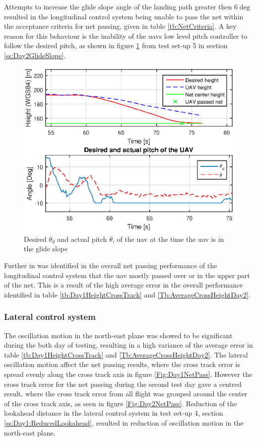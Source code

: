 Attempts to increase the glide slope angle of the landing path greater then $6 \deg$ resulted in the longitudinal control system being unable to pass the net within the acceptance criteria for net passing, given in table \ref{tb:NetCriteria}. A key reason for this behaviour is the inability of the \gls{uav}s low level pitch controller to follow the desired pitch, as shown in figure \ref{Fig:Pitch1juni081328} from test set-up 5 in section \ref{ss:Day2GlideSlope}. 
\begin{figure}[H]
\centering
\includegraphics[scale=0.7]{figs/Experiment/Pitch1juni081328.eps}
\caption{Desired $\theta_d$ and actual pitch $\theta$, of the \gls{uav} at the time the \gls{uav} is in the glide slope}
\label{Fig:Pitch1juni081328}
\end{figure}
Further in was identified in the overall net passing performance of the longitudinal control system that the \gls{uav} mostly passed over or in the upper part of the net. This is a result of the high average error in the overall performance identified in table \ref{tb:Day1HeightCrossTrack} and \ref{Tb:AverageCrossHeightDay2}.

\subsubsection{Lateral control system}
The oscillation motion in the north-east plane was showed to be significant during the both day of testing, resulting in a high variance of the average error in table \ref{tb:Day1HeightCrossTrack} and \ref{Tb:AverageCrossHeightDay2}. The lateral oscillation motion affect the net passing results, where the cross track error is spread evenly along the cross track axis in figure \ref{Fig:Day1NetPass}. However the cross track error for the net passing during the second test day gave a centred result, where the cross track error from all flight was grouped around the center of the cross track axis, as seen in figure \ref{Fig:Day2NetPass}. Reduction of the lookahead distance in the lateral control system in test set-up 4, section \ref{ss:Day1:ReducedLookahead}, resulted in reduction of oscillation motion in the north-east plane.

